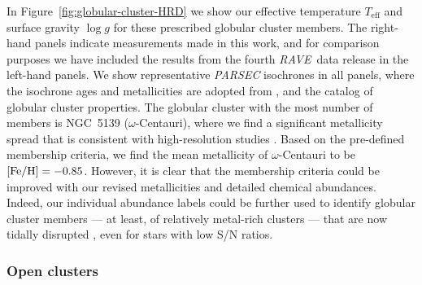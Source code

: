 \documentclass[preprint]{aastex}
\newcommand{\acronym}[1]{{\small{#1}}}
\newcommand{\project}[1]{\textsl{#1}}
\newcommand{\rave}{\project{\acronym{RAVE}}}
\newcommand{\teff}{T_{\mathrm{eff}}}
\newcommand{\logg}{\log g}
\begin{document}
In Figure~\ref{fig:globular-cluster-HRD} we show our effective temperature
$\teff$ and surface gravity $\logg$ for these prescribed globular cluster members.
The right-hand panels indicate measurements made in this work, and for comparison 
purposes we have included the results from the fourth \rave\ data release in the 
left-hand panels.  We show representative \project{PARSEC} isochrones 
\citep{Bressan_2012} in all panels, where the isochrone ages and metallicities 
are adopted from \citet{Kunder_2016,Marin-Franch_2009}, and the 
\citet[][accessed 6 September 2016]{Harris_1996} catalog of globular 
cluster properties.  The globular cluster with the most number of members is 
NGC~5139 ($\omega$-Centauri), where we find a significant metallicity spread
that is consistent with high-resolution studies \citep{Marino_2011,Carretta_2009,
Carretta_2013}. Based on the pre-defined membership criteria, we find the mean 
metallicity of $\omega$-Centauri to be $[{\rm Fe/H}] = -0.85$.  However, it 
is clear that the membership criteria could be improved with our revised 
metallicities and detailed chemical abundances.  Indeed, our individual abundance
labels could be further used to identify globular cluster members --- at least, of
relatively metal-rich clusters ---  that are now tidally disrupted 
\citep{Anguiano_2016,Kuzma_2016,Navin_2016}, even for stars with low S/N ratios.


\subsubsection{Open clusters}
\label{sec:open-cluster-validation}
\end{document}
